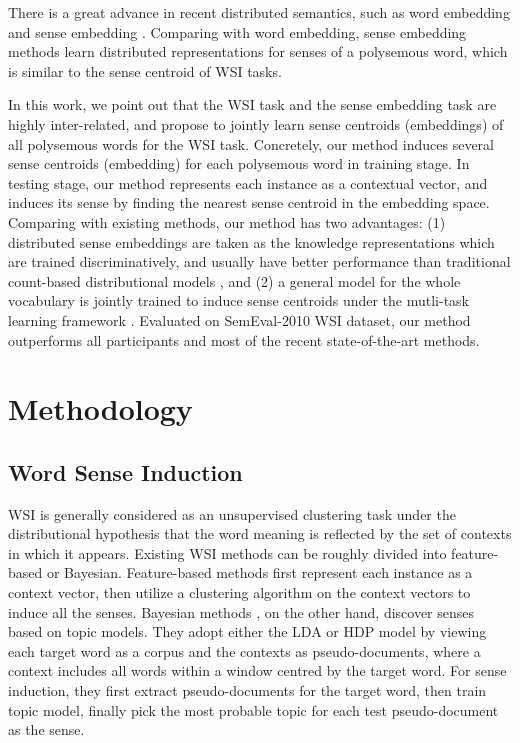 \documentclass[11pt]{article}
\begin{document}
There is a great advance in recent distributed semantics, such as word embedding \cite{mikolov2013distributed,pennington-socher-manning:2014:EMNLP2014} and 
sense embedding \cite{reisinger-mooney:2010:NAACLHLT,huang-EtAl:2012:ACL20122,jauhar-dyer-hovy:2015:NAACL-HLT,rothe-schutze:2015:ACL-IJCNLP,chen-liu-sun:2014:EMNLP2014,tian-EtAl:2014:Coling}.
Comparing with word embedding, sense embedding methods learn distributed representations for senses of a polysemous word, which is similar to the sense centroid of WSI tasks. 

In this work, we point out that the WSI task and the sense embedding task are highly inter-related, and propose to jointly learn sense centroids (embeddings) of all polysemous words for the WSI task. 
Concretely, our method induces several sense centroids (embedding) for each polysemous word in training stage. 
In testing stage, our method represents each instance as a contextual vector, and induces its sense by finding the nearest sense centroid in the embedding space.
Comparing with existing methods, our method has two advantages: 
(1) distributed sense embeddings are taken as the knowledge representations which are trained discriminatively, and usually have better performance than traditional count-based distributional models \cite{baroni-dinu-kruszewski:2014:P14-1},
and (2) a general model for the whole vocabulary is jointly trained to induce sense centroids under the mutli-task learning framework \cite{caruana1997multitask}.
Evaluated on SemEval-2010 WSI dataset, our method outperforms all participants and most of the recent state-of-the-art methods.


\section{Methodology}




\subsection{Word Sense Induction}

WSI is generally considered as an unsupervised clustering task under the distributional hypothesis \cite{harris1954distributional} that the word meaning is reflected by the set of contexts in which it appears. 
Existing WSI methods can be roughly divided into feature-based or Bayesian.
Feature-based methods first represent each instance as a context vector, then utilize a clustering algorithm on the context vectors to induce all the senses.
Bayesian methods \cite{brody-lapata:2009:EACL,yao2011nonparametric,lau-EtAl:2012:EACL2012,goyal2014unsupervised,TACL485}, on the other hand, discover senses based on topic models.
They adopt either the LDA \cite{LDA:2003} or HDP \cite{HDP:2006} model by viewing each target word as a corpus and the contexts as pseudo-documents, where a context includes all words within a window centred by the target word.
For sense induction, they first extract pseudo-documents for the target word, then train topic model, finally pick the most probable topic for each test pseudo-document as the sense.
\end{document}
